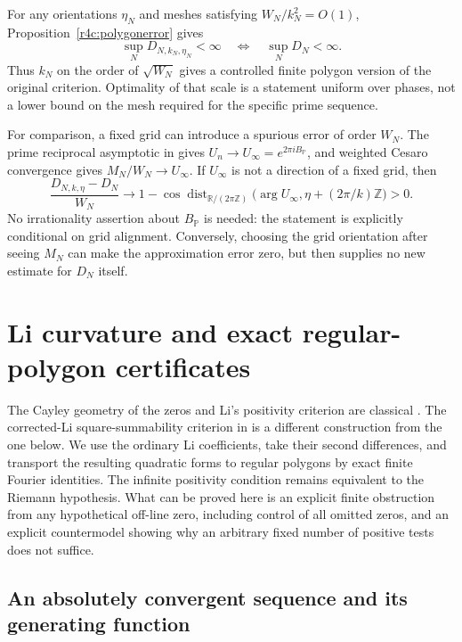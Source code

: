 \documentclass[11pt,a4paper]{article}
\theoremstyle{definition}\newtheorem{definition}[theorem]{Definition}
\theoremstyle{remark}\newtheorem{remark}[theorem]{Remark}
\newcommand{\R}{\mathbb R}\newcommand{\Z}{\mathbb Z}
\numberwithin{equation}{section}
\begin{document}
For any orientations $\eta_N$ and meshes satisfying
$W_N/k_N^2=O(1)$, Proposition~\ref{r4c:polygonerror} gives
\begin{equation}\label{r4c:polygoncriterion}
 \sup_ND_{N,k_N,\eta_N}<\infty
 \quad\Longleftrightarrow\quad
 \sup_ND_N<\infty.
\end{equation}
Thus $k_N$ on the order of $\sqrt{W_N}$ gives a controlled finite
polygon version of the original criterion.  Optimality of that
scale is a statement uniform over phases, not a lower bound on the
mesh required for the specific prime sequence.

For comparison, a fixed grid can introduce a spurious error of
order $W_N$.  The prime reciprocal asymptotic in
\cite{PrimeCircles} gives $U_n\to U_\infty=e^{2\pi i B_{\mathbb P}}$,
and weighted Cesaro convergence gives $M_N/W_N\to U_\infty$.
If $U_\infty$ is not a direction of a fixed grid, then
\[
 \frac{D_{N,k,\eta}-D_N}{W_N}
 \longrightarrow
 1-\cos\operatorname{dist}_{\R/(2\pi\Z)}
       \bigl(\arg U_\infty,\eta+(2\pi/k)\Z\bigr)>0.
\]
No irrationality assertion about $B_{\mathbb P}$ is needed: the
statement is explicitly conditional on grid alignment.  Conversely,
choosing the grid orientation after seeing $M_N$ can make the
approximation error zero, but then supplies no new estimate for
$D_N$ itself.

\section{Li curvature and exact regular-polygon certificates}
\label{r4l:section}

The Cayley geometry of the zeros and Li's positivity criterion are
classical \cite{Li,Lagarias,Suzuki}.  The corrected-Li square-summability
criterion in \cite{PrimeCircles} is a different construction from the
one below.  We use the ordinary Li coefficients, take their second
differences, and transport the resulting quadratic forms to regular
polygons by exact finite Fourier identities.  The infinite positivity
condition remains equivalent to the Riemann hypothesis.  What can be
proved here is an explicit finite obstruction from any hypothetical
off-line zero, including control of all omitted zeros, and an explicit
countermodel showing why an arbitrary fixed number of positive tests
does not suffice.

\subsection{An absolutely convergent sequence and its generating function}
\end{document}
